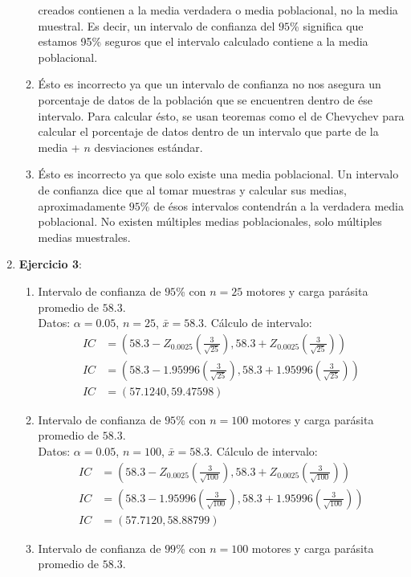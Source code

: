 \documentclass[12pt, letterpaper]{report}
\begin{document}
\begin{enumerate}
\begin{enumerate}
creados contienen a la media verdadera o media poblacional, no la media muestral. Es decir, un intervalo de confianza del $95$\% 
significa que estamos 95\% seguros que el intervalo calculado contiene a la media poblacional. 
\item Ésto es incorrecto ya que un intervalo de confianza no nos asegura un porcentaje de datos de la población que se encuentren 
dentro de ése intervalo. Para calcular ésto, se usan teoremas como el de Chevychev para calcular el porcentaje de datos dentro de 
un intervalo que parte de la media + $n$ desviaciones estándar. 
\item Ésto es incorrecto ya que solo existe una media poblacional. Un intervalo de confianza dice que al tomar muestras y calcular sus 
medias, aproximadamente $95$\% de ésos intervalos contendrán a la verdadera media poblacional. No existen múltiples 
medias poblacionales, solo múltiples medias muestrales. 
\end{enumerate}
\item \textbf{Ejercicio 3}: 
\begin{enumerate}
\item Intervalo de confianza de $95$\% con $n = 25$ motores y carga parásita promedio de $58.3$. \\
Datos: $\alpha = 0.05$, $n = 25$, $\bar{x} = 58.3$. Cálculo de intervalo: 
\begin{align*}
    IC &= (58.3 - Z_{0.0025}(\frac{3}{\sqrt{25}}), 58.3 +  Z_{0.0025}(\frac{3}{\sqrt{25}}))\\ 
    IC &= (58.3 - 1.95996(\frac{3}{\sqrt{25}}), 58.3 +  1.95996(\frac{3}{\sqrt{25}}))\\
    IC &= (57.1240, 59.47598)
\end{align*}
\item Intervalo de confianza de $95$\% con $n = 100$ motores y carga parásita promedio de $58.3$. \\
Datos: $\alpha = 0.05$, $n = 100$, $\bar{x} = 58.3$. Cálculo de intervalo: 
\begin{align*}
    IC &= (58.3 - Z_{0.0025}(\frac{3}{\sqrt{100}}), 58.3 +  Z_{0.0025}(\frac{3}{\sqrt{100}}))\\ 
    IC &= (58.3 - 1.95996(\frac{3}{\sqrt{100}}), 58.3 +  1.95996(\frac{3}{\sqrt{100}}))\\
    IC &= (57.7120, 58.88799)
\end{align*}
\item Intervalo de confianza de $99$\% con $n = 100$ motores y carga parásita promedio de $58.3$. \\

\end{enumerate}
\end{enumerate}
\end{document}
